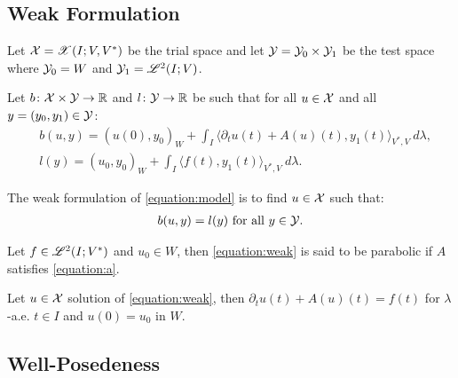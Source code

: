 \newpage
\subsection{Weak Formulation}

\begin{definition}
    Let $\mathcal{X} = \mathscr{X}(I; V, V^*)$ be the trial space and let $\mathcal{Y} = \mathcal{Y}_0 \times \mathcal{Y}_1$ be the test space where $\mathcal{Y}_0 = W$ and $\mathcal{Y}_1 = \mathscr{L}^{2}(I; V)$.
\end{definition}

\begin{definition}[$b$ and $l$]
    Let $b \colon \mathcal{X} \times \mathcal{Y} \rightarrow \mathbb{R}$ and $l \colon \mathcal{Y} \rightarrow \mathbb{R}$ be such that for all $u \in \mathcal{X}$ and all $y = (y_0, y_1) \in \mathcal{Y}$:
    \begin{align}
        & b(u, y) = \left( u(0), y_0 \right)_W + \int_I \langle \partial_t u(t) + A(u)(t), y_1(t) \rangle_{V^*, V} ~ d \lambda, \\
        & l(y) = \left( u_0, y_0 \right)_W + \int_I \langle f(t), y_1(t) \rangle_{V^*, V} ~ d \lambda.
    \end{align}
\end{definition}

\begin{definition}
    The weak formulation of \cref{equation:model} is to find $u \in \mathcal{X}$ such that:
    \begin{gather}
        b(u, y) = l(y) \text{ for all } y \in \mathcal{Y}. \label{equation:weak}
    \end{gather}
\end{definition}

\begin{definition}
    Let $f \in \mathscr{L}^{2}(I; V^*)$ and $u_0 \in W$, then \cref{equation:weak} is said to be parabolic if $A$ satisfies \cref{equation:a}.
\end{definition}

\begin{lemma}
    Let $u \in \mathcal{X}$ solution of \cref{equation:weak}, then $\partial_t u(t) + A(u)(t) = f(t)$ for $\lambda$-a.e. $t \in I$ and $u(0) = u_0$ in $W$.
\end{lemma}

\newpage
\subsection{Well-Posedeness}

